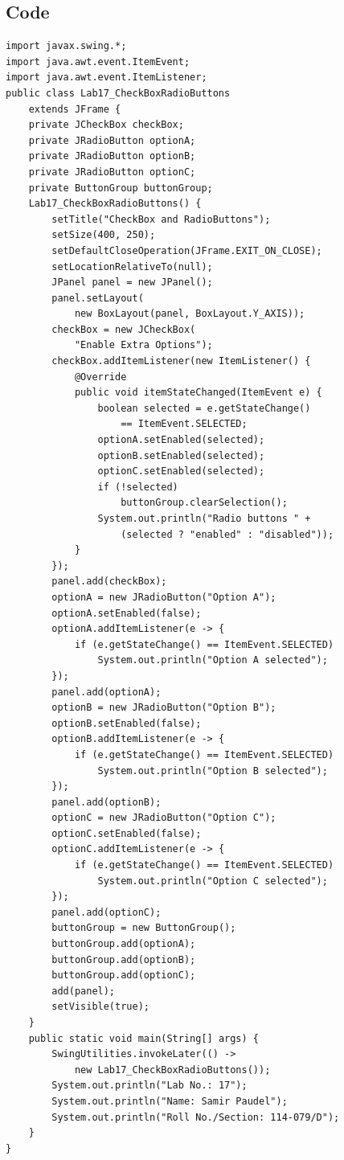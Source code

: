 \documentclass[10pt,a4paper]{article}
\begin{document}
\subsection*{Code}
\begin{multicols}{2}
\begin{lstlisting}
import javax.swing.*;
import java.awt.event.ItemEvent;
import java.awt.event.ItemListener;
public class Lab17_CheckBoxRadioButtons 
    extends JFrame {
    private JCheckBox checkBox;
    private JRadioButton optionA;
    private JRadioButton optionB;
    private JRadioButton optionC;
    private ButtonGroup buttonGroup;
    Lab17_CheckBoxRadioButtons() {
        setTitle("CheckBox and RadioButtons");
        setSize(400, 250);
        setDefaultCloseOperation(JFrame.EXIT_ON_CLOSE);
        setLocationRelativeTo(null);
        JPanel panel = new JPanel();
        panel.setLayout(
            new BoxLayout(panel, BoxLayout.Y_AXIS));
        checkBox = new JCheckBox(
            "Enable Extra Options");
        checkBox.addItemListener(new ItemListener() {
            @Override
            public void itemStateChanged(ItemEvent e) {
                boolean selected = e.getStateChange() 
                    == ItemEvent.SELECTED;
                optionA.setEnabled(selected);
                optionB.setEnabled(selected);
                optionC.setEnabled(selected);
                if (!selected) 
                    buttonGroup.clearSelection();
                System.out.println("Radio buttons " + 
                    (selected ? "enabled" : "disabled"));
            }
        });
        panel.add(checkBox);
        optionA = new JRadioButton("Option A");
        optionA.setEnabled(false);
        optionA.addItemListener(e -> {
            if (e.getStateChange() == ItemEvent.SELECTED)
                System.out.println("Option A selected");
        });
        panel.add(optionA);
        optionB = new JRadioButton("Option B");
        optionB.setEnabled(false);
        optionB.addItemListener(e -> {
            if (e.getStateChange() == ItemEvent.SELECTED)
                System.out.println("Option B selected");
        });
        panel.add(optionB);
        optionC = new JRadioButton("Option C");
        optionC.setEnabled(false);
        optionC.addItemListener(e -> {
            if (e.getStateChange() == ItemEvent.SELECTED)
                System.out.println("Option C selected");
        });
        panel.add(optionC);
        buttonGroup = new ButtonGroup();
        buttonGroup.add(optionA);
        buttonGroup.add(optionB);
        buttonGroup.add(optionC);
        add(panel);
        setVisible(true);
    }
    public static void main(String[] args) {
        SwingUtilities.invokeLater(() -> 
            new Lab17_CheckBoxRadioButtons());
        System.out.println("Lab No.: 17");
        System.out.println("Name: Samir Paudel");
        System.out.println("Roll No./Section: 114-079/D");
    }
}
\end{lstlisting}
\end{multicols}
\end{document}
